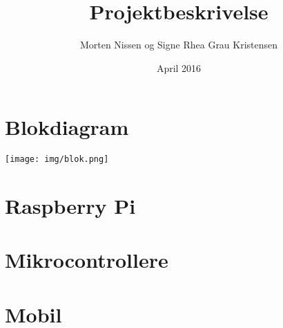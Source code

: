 \documentclass{article}
\title{Projektbeskrivelse}
\author{Morten Nissen og Signe Rhea Grau Kristensen}
\date{April 2016}
\begin{document}
\maketitle

\section{Blokdiagram}
\texttt{[image: img/blok.png]}

\section{Raspberry Pi}


\section{Mikrocontrollere}


\section{Mobil}

\end{document}

